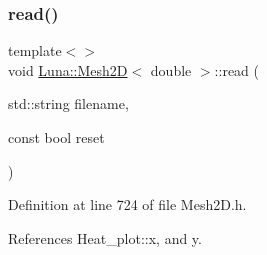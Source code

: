 \subsubsection{\texorpdfstring{read()}{read()}\hspace{0.1cm}{\footnotesize\ttfamily [2/2]}}
{\footnotesize\ttfamily template$<$$>$ \\
void \hyperlink{classLuna_1_1Mesh2D}{Luna\+::\+Mesh2D}$<$ double $>$\+::read (\begin{DoxyParamCaption}\item[{std\+::string}]{filename,  }\item[{const bool}]{reset }\end{DoxyParamCaption})}



Definition at line 724 of file Mesh2\+D.\+h.



References Heat\+\_\+plot\+::x, and y.


